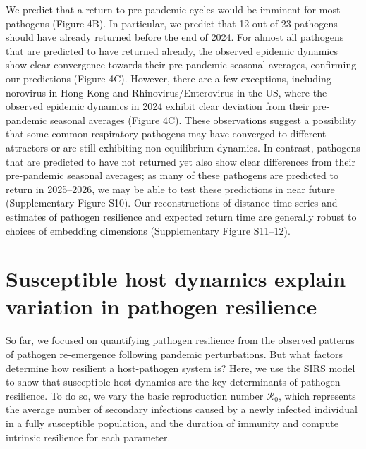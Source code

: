 \documentclass[12pt]{article}
\begin{document}
We predict that a return to pre-pandemic cycles would be imminent for most pathogens (Figure 4B).
In particular, we predict that 12 out of 23 pathogens should have already returned before the end of 2024.
For almost all pathogens that are predicted to have returned already, the observed epidemic dynamics show clear convergence towards their pre-pandemic seasonal averages, confirming our predictions (Figure 4C).
However, there are a few exceptions, including norovirus in Hong Kong and Rhinovirus/Enterovirus in the US, where the observed epidemic dynamics in 2024 exhibit clear deviation from their pre-pandemic seasonal averages (Figure 4C).
These observations suggest a possibility that some common respiratory pathogens may have converged to different attractors or are still exhibiting non-equilibrium dynamics.
In contrast, pathogens that are predicted to have not returned yet also show clear differences from their pre-pandemic seasonal averages; as many of these pathogens are predicted to return in 2025--2026, we may be able to test these predictions in near future (Supplementary Figure S10).
Our reconstructions of distance time series and estimates of pathogen resilience and expected return time are generally robust to choices of embedding dimensions (Supplementary Figure S11--12).

\section*{Susceptible host dynamics explain variation in pathogen resilience}

So far, we focused on quantifying pathogen resilience from the observed patterns of pathogen re-emergence following pandemic perturbations.
But what factors determine how resilient a host-pathogen system is?
Here, we use the SIRS model to show that susceptible host dynamics are the key determinants of pathogen resilience.
To do so, we vary the basic reproduction number $\mathcal R_0$, which represents the average number of secondary infections caused by a newly infected individual in a fully susceptible population, and the duration of immunity and compute intrinsic resilience for each parameter.
\end{document}
